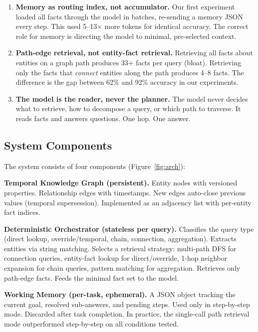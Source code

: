 \documentclass[11pt,a4paper]{article}
\begin{document}
\begin{enumerate}[leftmargin=*]
    \item \textbf{Memory as routing index, not accumulator.} Our first experiment loaded all facts through the model in batches, re-sending a memory JSON every step. This used 5--13$\times$ more tokens for identical accuracy. The correct role for memory is directing the model to minimal, pre-selected context.

    \item \textbf{Path-edge retrieval, not entity-fact retrieval.} Retrieving all facts about entities on a graph path produces 33+ facts per query (bloat). Retrieving only the facts that \emph{connect} entities along the path produces 4--8 facts. The difference is the gap between 62\% and 92\% accuracy in our experiments.

    \item \textbf{The model is the reader, never the planner.} The model never decides what to retrieve, how to decompose a query, or which path to traverse. It reads facts and answers questions. One hop. One answer.
\end{enumerate}

\subsection{System Components}

The system consists of four components (Figure~\ref{fig:arch}):

\textbf{Temporal Knowledge Graph (persistent).} Entity nodes with versioned properties. Relationship edges with timestamps. New edges auto-close previous values (temporal supersession). Implemented as an adjacency list with per-entity fact indices.

\textbf{Deterministic Orchestrator (stateless per query).} Classifies the query type (direct lookup, override/temporal, chain, connection, aggregation). Extracts entities via string matching. Selects a retrieval strategy: multi-path DFS for connection queries, entity-fact lookup for direct/override, 1-hop neighbor expansion for chain queries, pattern matching for aggregation. Retrieves only path-edge facts. Feeds the minimal fact set to the model.

\textbf{Working Memory (per-task, ephemeral).} A JSON object tracking the current goal, resolved sub-answers, and pending steps. Used only in step-by-step mode. Discarded after task completion. In practice, the single-call path retrieval mode outperformed step-by-step on all conditions tested.
\end{document}
